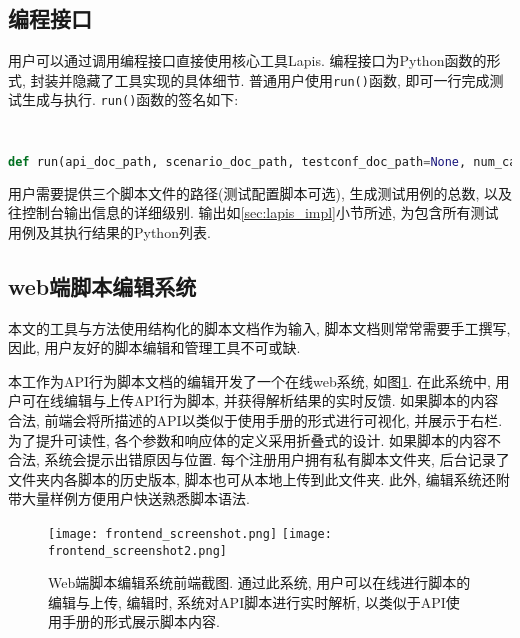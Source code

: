 		\subsection{编程接口}
            \label{sec:program_interface}
            用户可以通过调用编程接口直接使用核心工具Lapis. 编程接口为Python函数的形式, 封装并隐藏了工具实现的具体细节. 普通用户使用\texttt{run()}函数, 即可一行完成测试生成与执行. \texttt{run()}函数的签名如下:
            \begin{flushleft}
                \scriptsize
                \tt
                \begin{lstlisting}[language=python]
def run(api_doc_path, scenario_doc_path, testconf_doc_path=None, num_case=1, verbose=0)
                \end{lstlisting}
            \end{flushleft}
            用户需要提供三个脚本文件的路径(测试配置脚本可选), 生成测试用例的总数, 以及往控制台输出信息的详细级别. 输出如\ref{sec:lapis_impl}小节所述, 为包含所有测试用例及其执行结果的Python列表.
            
		\subsection{web端脚本编辑系统}

            本文的工具与方法使用结构化的脚本文档作为输入, 脚本文档则常常需要手工撰写, 因此, 用户友好的脚本编辑和管理工具不可或缺.
            
            本工作为API行为脚本文档的编辑开发了一个在线web系统, 如图\ref{fig:frontend_screenshot}. 在此系统中, 用户可在线编辑与上传API行为脚本, 并获得解析结果的实时反馈. 如果脚本的内容合法, 前端会将所描述的API以类似于使用手册的形式进行可视化, 并展示于右栏. 为了提升可读性, 各个参数和响应体的定义采用折叠式的设计. 如果脚本的内容不合法, 系统会提示出错原因与位置. 每个注册用户拥有私有脚本文件夹, 后台记录了文件夹内各脚本的历史版本, 脚本也可从本地上传到此文件夹. 此外, 编辑系统还附带大量样例方便用户快送熟悉脚本语法.

            \begin{figure}
                \centering
                \texttt{[image: frontend\_screenshot.png]}
                \texttt{[image: frontend\_screenshot2.png]}
                \caption{Web端脚本编辑系统前端截图. 通过此系统, 用户可以在线进行脚本的编辑与上传, 编辑时, 系统对API脚本进行实时解析, 以类似于API使用手册的形式展示脚本内容.}
                \label{fig:frontend_screenshot}
            \end{figure}
            
